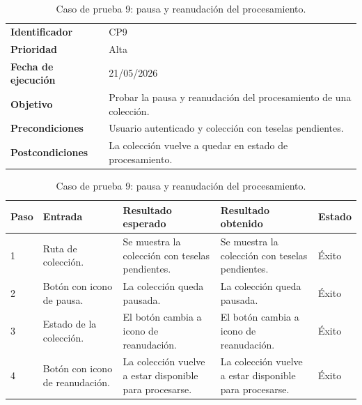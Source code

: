 \begin{table}[]
	\centering
	\footnotesize
	\renewcommand{\arraystretch}{1.2}
	\begin{tabularx}{\textwidth}{p{3.2cm} X}
		\toprule
		\textbf{Identificador} & CP9 \\
		\textbf{Prioridad} & Alta \\
		\textbf{Fecha de ejecución} & 21/05/2026 \\
		\textbf{Objetivo} & Probar la pausa y reanudación del procesamiento de una colección. \\
		\textbf{Precondiciones} & Usuario autenticado y colección con teselas pendientes. \\
		\textbf{Postcondiciones} & La colección vuelve a quedar en estado de procesamiento. \\
		\midrule
	\end{tabularx}
	\begin{tabularx}{\textwidth}{p{0.8cm} p{3.2cm} X X p{1.3cm}}
		\textbf{Paso} & \textbf{Entrada} & \textbf{Resultado esperado} & \textbf{Resultado obtenido} & \textbf{Estado} \\
		\midrule
		1 & Ruta de colección. & Se muestra la colección con teselas pendientes. & Se muestra la colección con teselas pendientes. & Éxito \\
		2 & Botón con icono de pausa. & La colección queda pausada. & La colección queda pausada. & Éxito \\
		3 & Estado de la colección. & El botón cambia a icono de reanudación. & El botón cambia a icono de reanudación. & Éxito \\
		4 & Botón con icono de reanudación. & La colección vuelve a estar disponible para procesarse. & La colección vuelve a estar disponible para procesarse. & Éxito \\
		\bottomrule
	\end{tabularx}
	\caption{Caso de prueba 9: pausa y reanudación del procesamiento.}
	\label{tab:cp9}
\end{table}

